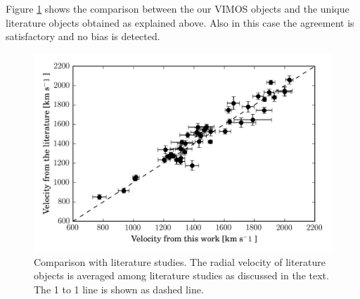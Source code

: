 \documentclass[useAMS,usenatbib]{mn2e}
\newcommand{\kms}{\mbox{\,km~s$^{-1}$}}
\begin{document}
Figure \ref{fig:vel_comparison} shows the comparison between the our VIMOS objects and the unique literature objects obtained as explained above. Also in this case the agreement is satisfactory and no bias is detected. 



\begin{figure}
\centering
\includegraphics[width=\columnwidth]{figures/vel_literature.png} 
\caption{Comparison with literature studies. The radial velocity of literature objects is averaged among literature studies as discussed in the text. The 1 to 1 line is shown as dashed line. }
\label{fig:vel_comparison}
\end{figure}
\end{document}

